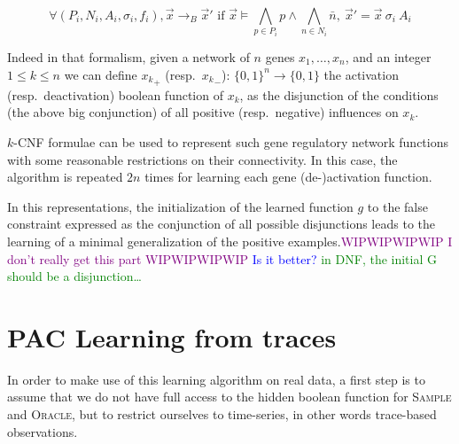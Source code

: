 \documentclass{llncs}
\newcommand{\wip}[1]{\textcolor{Purple}{WIPWIPWIPWIP #1 WIPWIPWIPWIP}}
\newcommand{\francois}[1]{\textcolor{blue}{#1}}
\newcommand{\sylvain}[1]{\textcolor{green}{#1}}
\newcommand{\lra}{\longrightarrow}
\begin{document}
\begin{definition}
$$\forall (P_i, N_i, A_i, \sigma_i, f_i),
{\vec x}\lra_B{\vec x'}\text{ if }{\vec x}\models \bigwedge_{p\in
P_i}p\wedge\bigwedge_{n\in N_i}\bar{n},\ {\vec x'} = {\vec x}\ \sigma_i\ A_i$$
\end{definition}

  Indeed in that formalism, given a network of $n$ genes $x_1,\ldots,x_n$, and
  an integer $1 \leq k \leq n$ we can define ${x_k}_+$ (resp.\ ${x_k}_-$):
  ${\{0,1\}}^n \rightarrow\{0,1\}$ the activation (resp.\ deactivation)
  boolean function of $x_k$, as the disjunction of the conditions (the above
  big conjunction) of all positive (resp.\ negative) influences on $x_k$.



$k$-CNF formulae can be used to represent such gene regulatory network functions with some reasonable restrictions on their connectivity.
In this case, the algorithm is repeated $2 n$ times for learning each gene (de-)activation function.

In this representations, the initialization of the learned function $g$ to the false constraint expressed as the conjunction of all possible disjunctions
leads to the learning of a minimal generalization of the positive examples.\wip{I don't really get this part}
\francois{Is it better?}
\sylvain{in DNF, the initial G should be a disjunction\dots}

\section{PAC Learning from traces}

In order to make use of this learning algorithm on real data, a first step is
to assume that we do not have full access to the hidden boolean function for
\textsc{Sample} and \textsc{Oracle}, but to restrict ourselves to time-series,
in other words trace-based observations.
\end{document}
